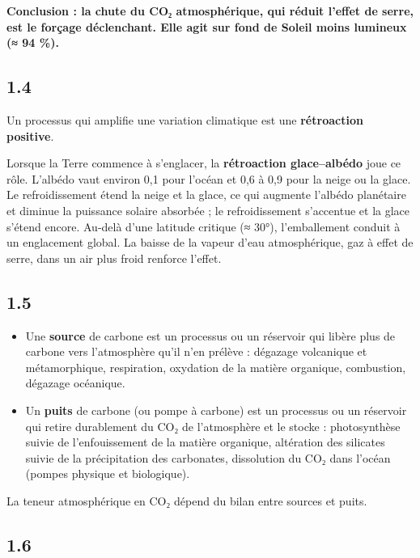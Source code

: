 \documentclass[11pt,a4paper]{article}
\providecommand{\tightlist}{\setlength{\itemsep}{0pt}\setlength{\parskip}{0pt}}
\begin{document}
\textbf{Conclusion : la chute du CO₂ atmosphérique, qui réduit l'effet de serre, est le forçage déclenchant. Elle agit sur fond de Soleil moins lumineux (≈ 94 \%).}

\hypertarget{section-3}{%
\subsection{1.4}\label{section-3}}

Un processus qui amplifie une variation climatique est une \textbf{rétroaction positive}.

Lorsque la Terre commence à s'englacer, la \textbf{rétroaction glace--albédo} joue ce rôle. L'albédo vaut environ 0,1 pour l'océan et 0,6 à 0,9 pour la neige ou la glace. Le refroidissement étend la neige et la glace, ce qui augmente l'albédo planétaire et diminue la puissance solaire absorbée ; le refroidissement s'accentue et la glace s'étend encore. Au-delà d'une latitude critique (≈ 30°), l'emballement conduit à un englacement global. La baisse de la vapeur d'eau atmosphérique, gaz à effet de serre, dans un air plus froid renforce l'effet.

\hypertarget{section-4}{%
\subsection{1.5}\label{section-4}}

\begin{itemize}
\tightlist
\item
  Une \textbf{source} de carbone est un processus ou un réservoir qui libère plus de carbone vers l'atmosphère qu'il n'en prélève : dégazage volcanique et métamorphique, respiration, oxydation de la matière organique, combustion, dégazage océanique.
\item
  Un \textbf{puits} de carbone (ou pompe à carbone) est un processus ou un réservoir qui retire durablement du CO₂ de l'atmosphère et le stocke : photosynthèse suivie de l'enfouissement de la matière organique, altération des silicates suivie de la précipitation des carbonates, dissolution du CO₂ dans l'océan (pompes physique et biologique).
\end{itemize}

La teneur atmosphérique en CO₂ dépend du bilan entre sources et puits.

\hypertarget{section-5}{%
\subsection{1.6}\label{section-5}}
\end{document}
